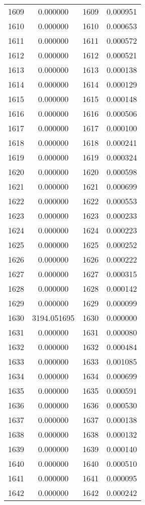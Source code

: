 \documentclass[12pt]{article}
\begin{document}
\begin{longtable}{@{}cccc@{}}
1609 & 0.000000 & 1609 & 0.000951 \\
1610 & 0.000000 & 1610 & 0.000653 \\
1611 & 0.000000 & 1611 & 0.000572 \\
1612 & 0.000000 & 1612 & 0.000521 \\
1613 & 0.000000 & 1613 & 0.000138 \\
1614 & 0.000000 & 1614 & 0.000129 \\
1615 & 0.000000 & 1615 & 0.000148 \\
1616 & 0.000000 & 1616 & 0.000506 \\
1617 & 0.000000 & 1617 & 0.000100 \\
1618 & 0.000000 & 1618 & 0.000241 \\
1619 & 0.000000 & 1619 & 0.000324 \\
1620 & 0.000000 & 1620 & 0.000598 \\
1621 & 0.000000 & 1621 & 0.000699 \\
1622 & 0.000000 & 1622 & 0.000553 \\
1623 & 0.000000 & 1623 & 0.000233 \\
1624 & 0.000000 & 1624 & 0.000223 \\
1625 & 0.000000 & 1625 & 0.000252 \\
1626 & 0.000000 & 1626 & 0.000222 \\
1627 & 0.000000 & 1627 & 0.000315 \\
1628 & 0.000000 & 1628 & 0.000142 \\
1629 & 0.000000 & 1629 & 0.000099 \\
1630 & 3194.051695 & 1630 & 0.000000 \\
1631 & 0.000000 & 1631 & 0.000080 \\
1632 & 0.000000 & 1632 & 0.000484 \\
1633 & 0.000000 & 1633 & 0.001085 \\
1634 & 0.000000 & 1634 & 0.000699 \\
1635 & 0.000000 & 1635 & 0.000591 \\
1636 & 0.000000 & 1636 & 0.000530 \\
1637 & 0.000000 & 1637 & 0.000138 \\
1638 & 0.000000 & 1638 & 0.000132 \\
1639 & 0.000000 & 1639 & 0.000140 \\
1640 & 0.000000 & 1640 & 0.000510 \\
1641 & 0.000000 & 1641 & 0.000095 \\
1642 & 0.000000 & 1642 & 0.000242 \\

\end{longtable}
\end{document}
